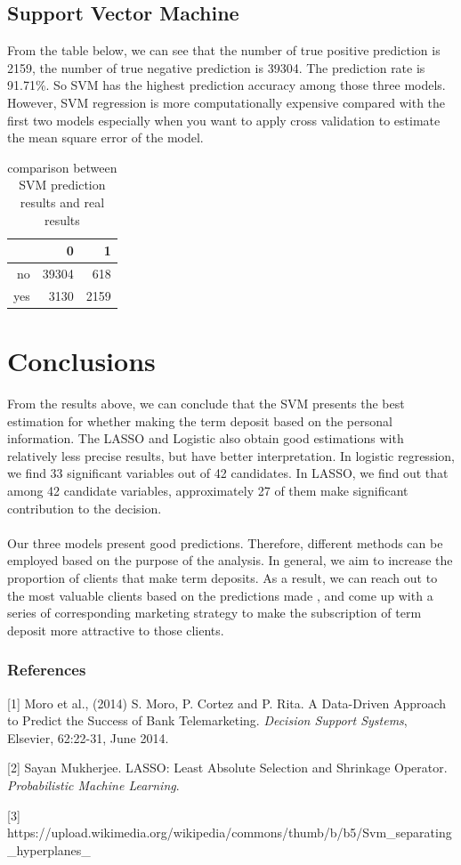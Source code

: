 \documentclass{article} %
\begin{document}
\subsection{Support Vector Machine}
From the table below, we can see that the number of true positive prediction is 2159, the number of true negative prediction is 39304. The prediction rate is 91.71\%. So SVM has the highest prediction accuracy among those three models. However, SVM regression is more computationally expensive compared with the first two models especially when you want to apply cross validation to estimate the mean square error of the model.
\begin{table}[ht]
\caption{comparison between SVM prediction results and real results}
\centering
\begin{tabular}{rrr}
  \hline
 & 0 & 1 \\ 
  \hline
no & 39304 & 618 \\ 
  yes & 3130 & 2159 \\ 
   \hline
\end{tabular}
\end{table}


\section{Conclusions}
From the results above, we can conclude that the SVM presents the best estimation for whether making the term deposit based on the personal information. The LASSO and Logistic also obtain good estimations with relatively less precise results, but have better interpretation. In logistic regression, we find 33 significant variables out of 42 candidates. In LASSO, we find out that among 42 candidate variables, approximately 27 of them make significant contribution to the decision. \\\\
Our three models present good predictions. Therefore, different methods can be employed based on the purpose of the analysis. In general, we aim to increase the proportion of clients that make term deposits. As a result, we can reach out to the most valuable clients based on the predictions made , and come up with a series of corresponding marketing strategy to make the subscription of term deposit more attractive to those clients.



\subsubsection*{References}
\small{
[1] Moro et al., (2014) S. Moro, P. Cortez and P. Rita. A Data-Driven Approach to Predict the Success of Bank Telemarketing. {\it Decision Support Systems}, Elsevier, 62:22-31, June 2014.

[2] Sayan Mukherjee. LASSO: Least Absolute Selection and Shrinkage Operator. {\it Probabilistic Machine Learning}.

[3] https://upload.wikimedia.org/wikipedia/commons/thumb/b/b5/Svm\_separating\_hyperplanes\_%
}
\end{document}
